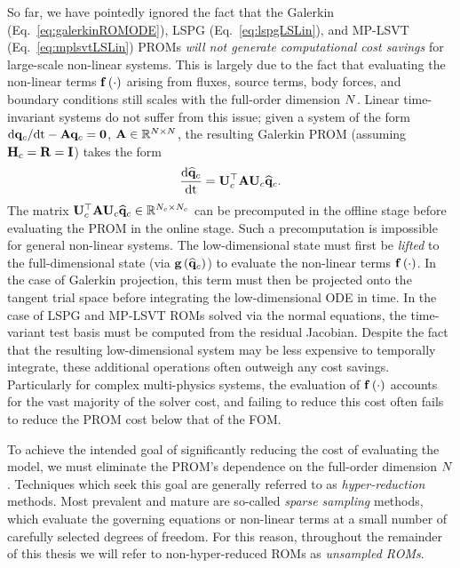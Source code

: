 So far, we have pointedly ignored the fact that the Galerkin (Eq.~\ref{eq:galerkinROMODE}), LSPG (Eq.~\ref{eq:lspgLSLin}), and MP-LSVT (Eq.~\ref{eq:mplsvtLSLin}) PROMs \textit{will not generate computational cost savings} for large-scale non-linear systems. This is largely due to the fact that evaluating the non-linear terms $\mathbf{f} \left(\cdot\right)$ arising from fluxes, source terms, body forces, and boundary conditions still scales with the full-order dimension $N$. Linear time-invariant systems do not suffer from this issue; given a system of the form $\text{d}\mathbf{q}_{c}/\text{d}\text{t} - \mathbf{A} \mathbf{q}_{c} = \mathbf{0}$, $\mathbf{A} \in \mathbb{R}^{N \times N}$, the resulting Galerkin PROM (assuming $\consScale = \resScale = \identMat$) takes the form
%
\begin{equation}
    \ode{\consVecCoef}{\timeVar} = \consTrial^\top \dummyMat \consTrial \consVecCoef.
\end{equation}
%
The matrix $\consTrial^\top \dummyMat \consTrial \consVecCoef \inRTwo{\numConsModes}{\numConsModes}$ can be precomputed in the offline stage before evaluating the PROM in the online stage. Such a precomputation is impossible for general non-linear systems. The low-dimensional state must first be \textit{lifted} to the full-dimensional state (via $\mathbf{g} \left(\mathbf{\widehat{q}}_{c}\right)$) to evaluate the non-linear terms $\mathbf{f} \left(\cdot\right)$. In the case of Galerkin projection, this term must then be projected onto the tangent trial space before integrating the low-dimensional ODE in time. In the case of LSPG and MP-LSVT ROMs solved via the normal equations, the time-variant test basis must be computed from the residual Jacobian. Despite the fact that the resulting low-dimensional system may be less expensive to temporally integrate, these additional operations often outweigh any cost savings. Particularly for complex multi-physics systems, the evaluation of $\mathbf{f} \left(\cdot\right)$ accounts for the vast majority of the solver cost, and failing to reduce this cost often fails to reduce the PROM cost below that of the FOM.

To achieve the intended goal of significantly reducing the cost of evaluating the model, we must eliminate the PROM's dependence on the full-order dimension $N$. Techniques which seek this goal are generally referred to as \textit{hyper-reduction} methods. Most prevalent and mature are so-called \textit{sparse sampling} methods, which evaluate the governing equations or non-linear terms at a small number of carefully selected degrees of freedom. For this reason, throughout the remainder of this thesis we will refer to non-hyper-reduced ROMs as \textit{unsampled ROMs}.

